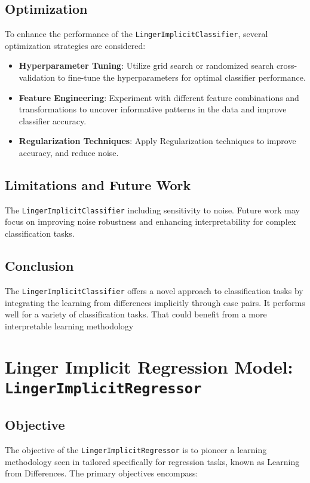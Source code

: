 \documentclass[a4paper, 12pt]{report}
\begin{document}
\subsection{Optimization}
To enhance the performance of the \texttt{LingerImplicitClassifier}, several optimization strategies are considered:
\begin{itemize}
    \item \textbf{Hyperparameter Tuning}: Utilize grid search or randomized search cross-validation to fine-tune the hyperparameters for optimal classifier performance.
    
    \item \textbf{Feature Engineering}: Experiment with different feature combinations and transformations to uncover informative patterns in the data and improve classifier accuracy.
    
    \item \textbf{Regularization Techniques}: Apply Regularization techniques to improve accuracy, and reduce noise.
\end{itemize}

\subsection{Limitations and Future Work}
The \texttt{LingerImplicitClassifier} including sensitivity to noise.
Future work may focus on improving noise robustness and enhancing interpretability for complex classification tasks.

\subsection{Conclusion}
The \texttt{LingerImplicitClassifier} offers a novel approach to classification tasks by integrating the learning from differences implicitly through case pairs. 
It performs well for a variety of classification tasks. 
That could benefit from a more interpretable learning methodology 

\section{Linger Implicit Regression Model: \texttt{LingerImplicitRegressor}}
\label{sec:lingerImplicit_regression_base_model}
\subsection{Objective}
The objective of the \texttt{LingerImplicitRegressor} is to pioneer a learning methodology seen in \cite{ye2021learning} tailored specifically for regression tasks, known as Learning from Differences. The primary objectives encompass:
\end{document}
